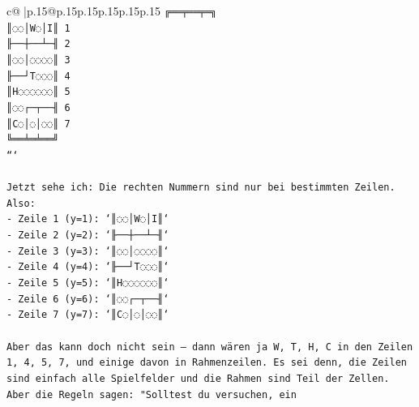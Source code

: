 \documentclass{article}
\begin{document}
{\begin{supertabular}{c@{$\;$}|p{.15\linewidth}@{}p{.15\linewidth}p{.15\linewidth}p{.15\linewidth}p{.15\linewidth}p{.15\linewidth}}
{{{\texttt{╔══╤══╤═╗} \\
\texttt{║◌◌│W◌│I║ 1} \\
\texttt{╟──┼──┴─╢ 2} \\
\texttt{║◌◌│◌◌◌◌║ 3} \\
\texttt{╟──┘T◌◌◌║ 4} \\
\texttt{║H◌◌◌◌◌◌║ 5} \\
\texttt{║◌◌┌─┬──╢ 6} \\
\texttt{║C◌│◌│◌◌║ 7} \\
\texttt{╚══╧═╧══╝} \\
\texttt{```} \\
\\ 
\texttt{Jetzt sehe ich: Die rechten Nummern sind nur bei bestimmten Zeilen. Also:} \\
\texttt{{-} Zeile 1 (y=1): `║◌◌│W◌│I║`} \\
\texttt{{-} Zeile 2 (y=2): `╟──┼──┴─╢`} \\
\texttt{{-} Zeile 3 (y=3): `║◌◌│◌◌◌◌║`} \\
\texttt{{-} Zeile 4 (y=4): `╟──┘T◌◌◌║`} \\
\texttt{{-} Zeile 5 (y=5): `║H◌◌◌◌◌◌║`} \\
\texttt{{-} Zeile 6 (y=6): `║◌◌┌─┬──╢`} \\
\texttt{{-} Zeile 7 (y=7): `║C◌│◌│◌◌║`} \\
\\ 
\texttt{Aber das kann doch nicht sein — dann wären ja W, T, H, C in den Zeilen 1, 4, 5, 7, und einige davon in Rahmenzeilen. Es sei denn, die Zeilen sind einfach alle Spielfelder und die Rahmen sind Teil der Zellen. Aber die Regeln sagen: "Solltest du versuchen, ein} \\
            }
        }
    }
     \\ \\


\end{supertabular}}
\end{document}

